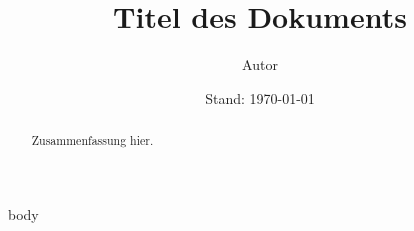 \documentclass[a4paper,BCOR=12mm]{scrartcl}  %
\title{Titel des Dokuments}
\author{Autor }
\date{Stand: \today}
\begin{document}
\maketitle

\begin{abstract}
    
    Zusammenfassung hier.
    
\end{abstract}

\tableofcontents


    {{ body }}


\printbibliography
\end{document}
